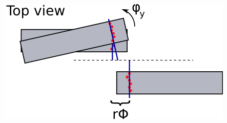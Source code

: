 \documentclass[compress]{beamer}
\begin{document}
\begin{frame}
\begin{columns}
\includegraphics[width=\linewidth]{order_of_parameters.png}
\end{columns}



\end{frame}
\end{document}
